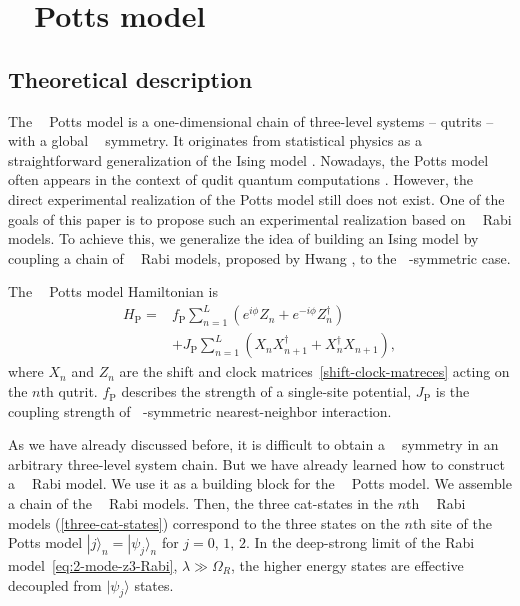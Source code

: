 \documentclass[reprint, aps, prx, amsmath, amssymb, longbibliography, superscriptaddress]{revtex4-2}
\DeclareMathOperator{\Zthree}{\mathbb{Z}_3}
\DeclareMathOperator{\Ztwo}{\mathbb{Z}_2}
\begin{document}
\section{\texorpdfstring{$\Zthree$}{Z3} Potts model}
\label{sec:potts-model}

\subsection{Theoretical description}
\label{theoretical-potts}


The $\Zthree$ Potts model \cite{wu_potts_1982} is a one-dimensional chain of three-level systems -- qutrits -- with a global $\Zthree$ symmetry. It  originates from statistical physics as a straightforward generalization of the Ising model  \cite{wu_potts_1982,baxter_critical_1982}. Nowadays, the Potts model often appears in the context of qudit quantum computations \cite{aharonov_polynomial_2007,okada_efficient_2019}. However, the direct experimental realization of the Potts model still does not exist. One of the goals of this paper is to propose such an experimental realization based on $\Zthree$ Rabi models. To achieve this, we generalize the idea of building an Ising model by coupling a chain of $\Ztwo$ Rabi models, proposed by Hwang \cite{hwang_largescale_2013}, to the $\Zthree$-symmetric case.

The $\Zthree$ Potts model Hamiltonian is
\begin{equation}
\begin{aligned}
\label{potts-hamiltonian}
H_{\text{P}} =& f_{\text{P}} \sum\limits_{n=1}^L \left(e^{i\phi}Z_n + e^{-i\phi}Z_n^{\dagger}\right) \\
  &+  J_{\text{P}} \sum\limits_{n=1}^L \left( X_n X_{n+1}^{\dagger} + X_n^{\dagger} X_{n+1}\right),
\end{aligned}
\end{equation}
where $X_n$ and $Z_n$ are the shift and clock matrices~\eqref{shift-clock-matreces} acting on the $n$th qutrit. $f _\text{P}$ describes the strength of a single-site potential, $J_{\text{P}}$ is the coupling strength of $\Zthree$-symmetric nearest-neighbor interaction.

As we have already discussed before, it is difficult to obtain a $\Zthree$ symmetry in an arbitrary three-level system chain. But we have already learned how to construct a $\Zthree$ Rabi model. We use it as a building block for the $\Zthree$ Potts model. We assemble a chain of the $\Zthree$ Rabi models. Then, the three cat-states in the $n$th $\Zthree$ Rabi models (\ref{three-cat-states}) correspond to the three states on the $n$th site of the Potts model $ |j\rangle_n = |\psi_j\rangle_n $ for $j=0,\, 1,\, 2$. In the deep-strong limit of the Rabi model~\eqref{eq:2-mode-z3-Rabi}, $ \lambda \gg \Omega_R$,  the higher energy states are effective decoupled from $|\psi_j\rangle$ states.
\end{document}
